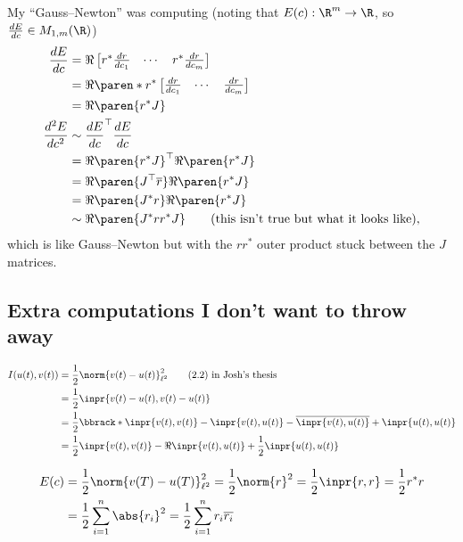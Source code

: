 \documentclass[12pt]{article}
\begin{document}
My ``Gauss–Newton'' was computing (noting that $E(c): \R^m
\rightarrow \R$, so $\frac{dE}{dc} \in M_{1,m}(\R)$)
\begin{align*}
  \frac{dE}{dc}
  &= \Re
  \begin{bmatrix}
    r^* \frac{dr}{dc_1} & \cdots & r^* \frac{dr}{dc_m}
  \end{bmatrix} \\
  &= \Re \paren*{r^*
    \begin{bmatrix}
      \frac{dr}{dc_1} & \cdots & \frac{dr}{dc_m}
  \end{bmatrix}} \\
  &= \Re \paren{r^* J} \\
  \frac{d^2 E}{dc^2}
  &\sim \frac{dE}{dc}^\top \frac{dE}{dc} \\
  &= \Re \paren{r^* J}^\top \Re \paren{r^* J} \\
  &= \Re \paren{J^\top \overline r} \Re \paren{r^* J} \\
  &= \Re \paren{J^* r} \Re \paren{r^* J} \\
  &\sim \Re \paren{J^* r r^* J} \qquad \text{(this isn't true but what
  it looks like)},
\end{align*}
which is like Gauss--Newton but with the $r r^*$ outer product stuck
between the $J$ matrices.

\subsection{Extra computations I don't want to throw away}

\begin{align*}
  I(u(t), v(t))
  &= \frac12 \norm{v(t) - u(t)}_{\ell^2}^2 \qquad \text{(2.2) in
  Josh's thesis} \\
  &= \frac12 \inpr{v(t) - u(t), v(t) - u(t)} \\
  &= \frac12 \bbrack*{\inpr{v(t), v(t)} - \inpr{v(t), u(t)} -
  \overline{\inpr{v(t), u(t)}} + \inpr{u(t), u(t)}} \\
  &= \frac12 \inpr{v(t), v(t)} - \Re{\inpr{v(t), u(t)}} + \frac12
  \inpr{u(t), u(t)}
\end{align*}

\begin{align*}
  E(c)
  &= \frac12 \norm{v(T) - u(T)}_{\ell^2}^2 = \frac12 \norm{r}^2  =
  \frac12 \inpr{r, r} = \frac12 r^* r \\
  &= \frac12 \sum_{i=1}^n \abs{r_i}^2 = \frac12 \sum_{i=1}^n r_i
  \overline{r_i}
\end{align*}
\end{document}
